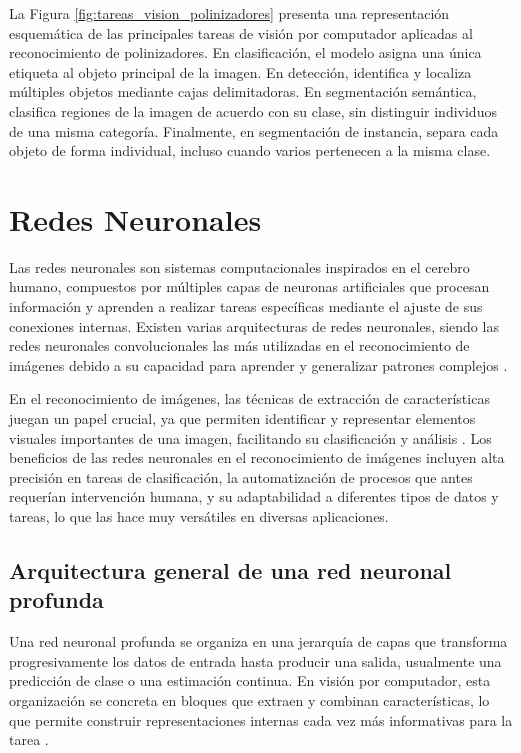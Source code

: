 La Figura \ref{fig:tareas_vision_polinizadores} presenta una representación esquemática de las principales tareas de visión por computador aplicadas al reconocimiento de polinizadores. En clasificación, el modelo asigna una única etiqueta al objeto principal de la imagen. En detección, identifica y localiza múltiples objetos mediante cajas delimitadoras. En segmentación semántica, clasifica regiones de la imagen de acuerdo con su clase, sin distinguir individuos de una misma categoría. Finalmente, en segmentación de instancia, separa cada objeto de forma individual, incluso cuando varios pertenecen a la misma clase.

\section{Redes Neuronales}

Las redes neuronales son sistemas computacionales inspirados en el cerebro
humano, compuestos por múltiples capas de neuronas artificiales que procesan información y aprenden a realizar tareas específicas mediante el ajuste de sus conexiones internas. Existen varias arquitecturas de redes neuronales, siendo las redes neuronales convolucionales las más utilizadas en el reconocimiento de imágenes debido a su capacidad para aprender y generalizar patrones complejos \parencite{stark2025pollinators}.

En el reconocimiento de imágenes, las técnicas de extracción de características juegan un papel crucial, ya que permiten identificar y representar elementos visuales importantes de una imagen, facilitando su clasificación y análisis \parencite{sajib2025comparative}. Los beneficios de las redes neuronales en el reconocimiento de imágenes incluyen alta precisión en tareas de clasificación, la automatización de procesos que antes requerían intervención humana, y su adaptabilidad a diferentes tipos de datos y tareas, lo que las hace muy versátiles en diversas aplicaciones.

\subsection{Arquitectura general de una red neuronal profunda}

Una red neuronal profunda se organiza en una jerarquía de capas que transforma progresivamente los datos de entrada hasta producir una salida, usualmente una predicción de clase o una estimación continua. En visión por computador, esta organización se concreta en bloques que extraen y combinan características, lo que permite construir representaciones internas cada vez más informativas para la tarea \parencite{khan2020survey}.

